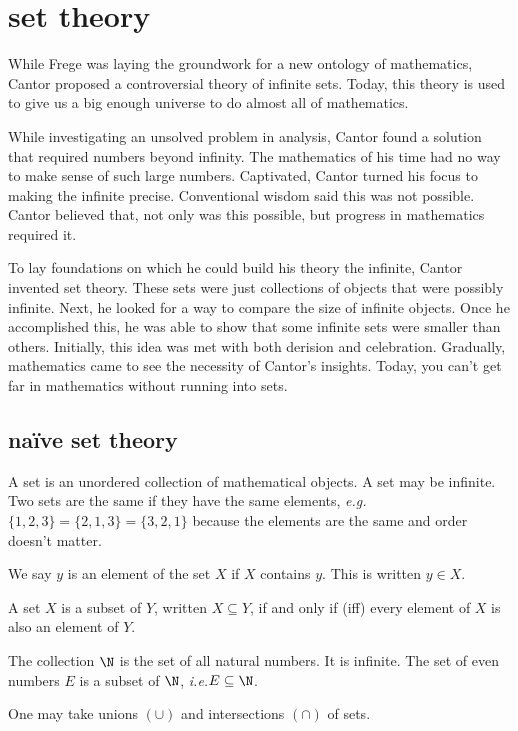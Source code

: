 \documentclass{scrbook}
\newcommand{\ie}{\emph{i.e.}\xspace}
\newcommand{\eg}{\emph{e.g.}\xspace}
\begin{document}
\chapter[Set theory]{set theory}
While Frege was laying the groundwork for a new ontology of mathematics, Cantor proposed a controversial theory of infinite sets. Today, this theory is used to give us a big enough universe to do almost all of mathematics.

While investigating an unsolved problem in analysis, Cantor found a solution that required numbers beyond infinity. 
The mathematics of his time had no way to make sense of such large numbers. Captivated, Cantor turned his focus to making the infinite precise. Conventional wisdom said this was not possible. Cantor believed that, not only was this possible, but progress in mathematics required it. 

To lay foundations on which he could build his theory the infinite, Cantor invented set theory. These sets were just collections of objects that were possibly infinite. Next, he looked for a way to compare the size of infinite objects. Once he accomplished this, he was able to show that some infinite sets were smaller than others. Initially, this idea was met with both derision and celebration. Gradually, mathematics came to see the necessity of Cantor's insights. Today, you can't get far in mathematics without running into sets. 
\section[Naïve set theory]{naïve set theory}
\begin{defn}
  A set is an unordered collection of mathematical objects. A set may be infinite. Two sets are the same if they have the same elements, \eg $\{1,2,3\}=\{2,1,3\}=\{3,2,1\}$ because the elements are the same and order doesn't matter. 
\end{defn}
\begin{defn}[member]
  We say $y$ is an element of the set $X$ if $X$ contains $y$. This is written $y\in X$.  
\end{defn}
\begin{defn}
  A set $X$ is a subset of $Y$, written $X\subseteq Y$, if and only if (iff) every element of $X$ is also an element of $Y$. 
\end{defn}
\begin{example}
  The collection $\N$ is the set of all natural numbers. It is infinite. The set of even numbers $E$ is a subset of $\N$, \ie $E\subseteq \N$. 
\end{example}
One may take unions $(\cup)$ and intersections $(\cap)$ of sets. 
\end{document}
